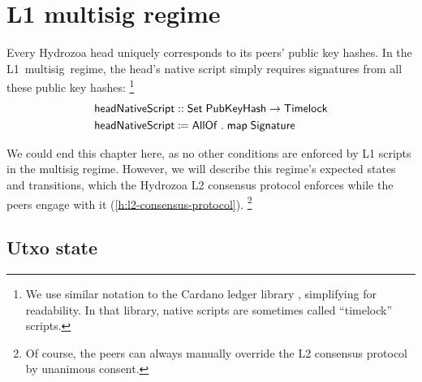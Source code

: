 \documentclass[../hydrozoa.tex]{subfiles}
\begin{document}
\chapter{L1 multisig regime}%
\label{h:l1-multisig-regime}%

Every Hydrozoa head uniquely corresponds to its peers' public key hashes.
In the L1~multisig~regime, the head's native script simply requires signatures from all these public key hashes:%
\footnote{We use similar notation to the Cardano ledger library \citep{IntersectMBOCardanoLedgerV117402025}, simplifying for readability.
In that library, native scripts are sometimes called ``timelock'' scripts.}
\begin{equation*}
\begin{split}
  \mathsf{headNativeScript} &:: \mathsf{Set} \; \mathsf{PubKeyHash} -> \mathsf{Timelock} \\
  \mathsf{headNativeScript} &\coloneq
    \mathsf{AllOf} \;.\; \mathsf{map} \; \mathsf{Signature}
\end{split}
\end{equation*}

We could end this chapter here, as no other conditions are enforced by L1 scripts in the multisig regime.
However, we will describe this regime's expected states and transitions, which the Hydrozoa L2 consensus protocol enforces while the peers engage with it (\cref{h:l2-consensus-protocol}).%
\footnote{Of course, the peers can always manually override the L2 consensus protocol by unanimous consent.}

\section{Utxo state}%
\label{h:l1-multisig-utxo-state}%
\end{document}
